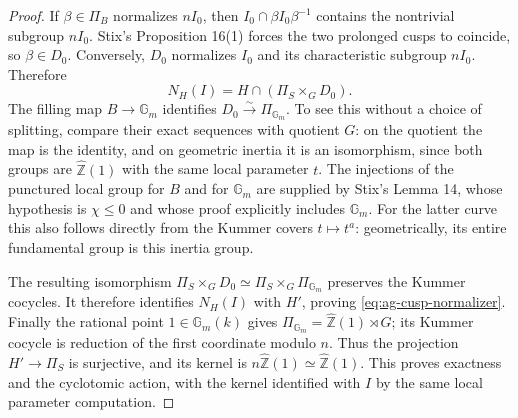 \documentclass[11pt,a4paper]{article}
\begin{document}
\begin{proof}
If $\beta\in\Pi_B$ normalizes $nI_0$, then
$I_0\cap\beta I_0\beta^{-1}$ contains the nontrivial subgroup
$nI_0$. Stix's Proposition 16(1) forces the two prolonged cusps
to coincide, so $\beta\in D_0$. Conversely, $D_0$ normalizes
$I_0$ and its characteristic subgroup $nI_0$. Therefore
\[
 N_H(I)=H\cap(\Pi_S\times_G D_0).
\]
The filling map $B\to\mathbb G_m$ identifies
$D_0\xrightarrow{\sim}\Pi_{\mathbb G_m}$.
To see this without a choice of splitting, compare their exact
sequences with quotient $G$: on the quotient the map is the
identity, and on geometric inertia it is an isomorphism, since
both groups are $\widehat{\mathbb Z}(1)$ with the same local
parameter $t$. The injections of the punctured local group for
$B$ and for $\mathbb G_m$ are supplied by Stix's Lemma 14,
whose hypothesis is $\chi\le0$ and whose proof explicitly includes
$\mathbb G_m$. For the latter curve this also follows directly
from the Kummer covers $t\mapsto t^a$: geometrically, its entire
fundamental group is this inertia group.

The resulting isomorphism
$\Pi_S\times_GD_0\simeq\Pi_S\times_G\Pi_{\mathbb G_m}$
preserves the Kummer cocycles. It therefore identifies $N_H(I)$
with $H'$, proving \eqref{eq:ag-cusp-normalizer}.
Finally the rational point $1\in\mathbb G_m(k)$ gives
$\Pi_{\mathbb G_m}=\widehat{\mathbb Z}(1)\rtimes G$; its Kummer
cocycle is reduction of the first coordinate modulo $n$.
Thus the projection $H'\to\Pi_S$ is surjective, and its kernel
is $n\widehat{\mathbb Z}(1)\simeq\widehat{\mathbb Z}(1)$.
This proves exactness and the cyclotomic action, with the kernel
identified with $I$ by the same local parameter computation.
\end{proof}
\end{document}
